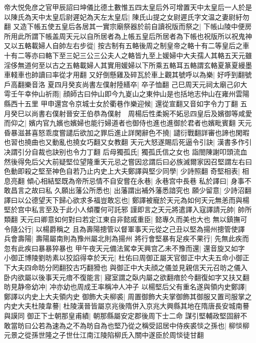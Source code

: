 帝大悦免彦之官甲辰詔曰坤儀比德土數惟五四太皇后外可增置天中太皇后一人於是以陳氏為天中太皇后尉遲妃為天左太皇后|{
	陳氏山提之女尉遲氏字文温之妻尉紆勿翻}
又造下帳五使五皇后各居其一實宗廟祭器於前自讀祝版而祭之|{
	下帳山陵中便房所用此所謂下帳盖周天元以自所居者為上帳五皇后所居者為下帳也祝版所以祝鬼神}
又以五輅載婦人自帥左右步從|{
	按古制有五輅後周之制皇帝之輅十有二等皇后之車十有二等亦曰輅下至三妃三公三公夫人之輅皆九至上媛婦中大夫孺人其輅五天元雖淫侈無道何至以古之五輅載婦人其實用媛婦以下所乘五輅耳五輅謂玄輅夏篆夏縵墨車輚車也帥讀曰率從才用翻}
又好倒懸雞及碎瓦於車上觀其號呼以為樂|{
	好呼到翻號戶高翻樂音洛}
夏四月癸亥尚書左僕射陸繕卒|{
	卒子恤翻}
己巳周天元祠太廟己卯大雩壬午幸仲山祈雨|{
	顔師古曰仲山即今九嵏山之東仲山是也括地志仲山在雍州雲陽縣西十五里}
甲申還宫令京城士女於衢巷作樂迎候|{
	還從宣翻又音如字令力丁翻}
五月癸巳以尚書右僕射晉安王伯恭為僕射　周楊后性柔婉不妬忌四皇后及嬪御等咸愛而仰之|{
	嬪内官九嬪也嬪婦也能行婦道者也御侍也進也進御於君者也嬪毗賓翻}
天元昏暴滋甚喜怒乖度嘗譴后欲加之罪后進止詳閑辭色不撓|{
	譴衍戰翻詳審也諦也閑暇也習也撓曲也又動亂也撓女巧翻又女教翻}
天元大怒遂賜后死逼令引訣|{
	漢書多作引决謂引分自裁也訣别也令力丁翻}
后母獨孤氏|{
	獨孤氏信之女也}
詣閤陳謝叩頭流血然後得免后父大前疑堅位望隆重天元忌之嘗因忿謂后曰必族滅爾家因召堅謂左右曰色動即殺之堅至神色自若乃止内史上大夫鄭譯與堅少同學|{
	少詩照翻}
奇堅相表|{
	相息亮翻}
傾心相結堅既為帝所忌情不自安嘗在永巷|{
	永巷宫中長巷}
私於譯曰|{
	身事不敢昌言之故曰私}
久願出藩公所悉也|{
	出藩謂出補外藩悉諳究也}
願少留意|{
	少詩沼翻}
譯曰以公德望天下歸心欲求多福豈敢忘也|{
	鄭譯被寵於天元為如何天元無恙而與楊堅於宫中私言至及于此小人傾覆何可託邪}
謹即言之天元將遣譯入寇譯請元帥|{
	帥所類翻}
天元曰卿意如何對曰若定江東自非懿戚重臣|{
	懿專久而美也大也}
無以鎮撫可令隨公行|{
	以楊爵稱之}
且為壽陽摠管以督軍事天元從之己丑以堅為揚州摠管使譯兵會壽陽|{
	壽陽屬南則為豫州屬北則為揚州}
將行會堅暴有足疾不果行|{
	先無此疾而忽有此疾曰暴暴猝暴也}
甲午夜天元備法駕幸天興宫乙未不豫而還|{
	還音旋又如字}
小御正博陵劉昉素以狡諂得幸於天元|{
	杜佑曰周御正屬天官御正中大夫五命小御正下大夫四命昉分罔翻狡古巧翻猾也}
與御正中大夫顔之儀並見親信天元召昉之儀入卧内欲屬以後事天元瘖不復能言|{
	寢室謂之臥内屬之欲翻瘖於今翻復如字又扶又翻}
昉見静帝幼冲|{
	冲亦幼也周成王率稱冲人冲子}
以楊堅后父有重名遂與領内史鄭譯|{
	鄭譯以内史上大夫領内史}
御飾大夫柳裘|{
	周置御飾大夫掌御飾其御服又置司服掌之}
内史大夫杜陵韋謩|{
	杜陵漢晉皆屬京兆後隋併入京兆大興縣其地在隋唐長安城南謩與謨同}
御正下士朝那皇甫績|{
	朝那縣屬安定郡後周下士二命}
謀引堅輔政堅固辭不敢當昉曰公若為速為之不為昉自為也堅乃從之稱受詔居中侍疾裘惔之孫也|{
	柳惔柳元景之從孫世隆之子世仕江南江陵陷柳氏入關中遂臣於周惔徒甘翻}
